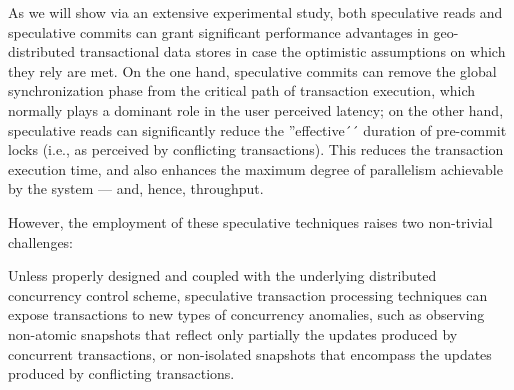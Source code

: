 As we will show via an extensive experimental study, both speculative reads and speculative commits can grant significant performance advantages in geo-distributed transactional data stores in case the optimistic assumptions on which they rely are met. On the one hand, speculative commits can remove the global synchronization phase from the critical path of transaction execution, which normally plays a dominant role in the user perceived latency; 
on the other hand, speculative reads can significantly reduce the ''effective´´ duration of pre-commit locks (i.e., as perceived by conflicting transactions). This reduces the transaction execution time, and also enhances the maximum degree of parallelism achievable by the system --- and, hence, throughput.

However, the employment of these speculative techniques raises two non-trivial challenges:

\vspace{4pt} Unless properly designed and coupled with the underlying distributed concurrency control scheme, speculative transaction processing techniques can expose transactions to new types of concurrency anomalies, such as 
observing non-atomic snapshots that reflect only partially the updates produced by concurrent transactions, or non-isolated snapshots that encompass the updates produced by conflicting transactions. 



